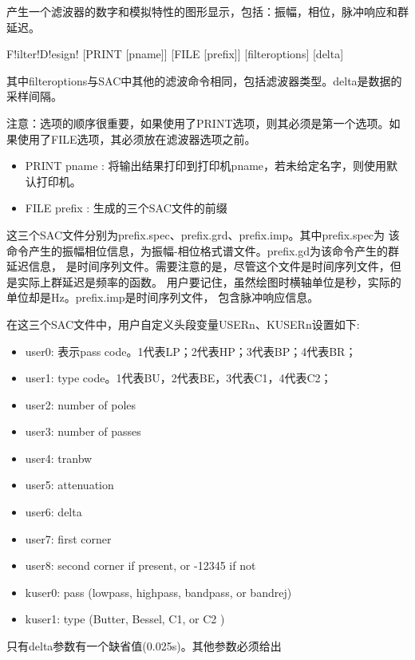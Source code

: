 \label{cmd:filterdesign}

产生一个滤波器的数字和模拟特性的图形显示，包括：振幅，相位，脉冲响应和群延迟。

\begin{SACSTX}
F!ilter!D!esign! [PRINT [pname]] [FILE [prefix]] [filteroptions] [delta]
\end{SACSTX}
其中filteroptions与SAC中其他的滤波命令相同，包括滤波器类型。delta是数据的采样间隔。

注意：选项的顺序很重要，如果使用了PRINT选项，则其必须是第一个选项。如果使用了FILE选项，其必须放在滤波器选项之前。

\begin{itemize}
\item PRINT pname : 将输出结果打印到打印机pname，若未给定名字，则使用默认打印机。
\item FILE prefix : 生成的三个SAC文件的前缀
\end{itemize}

这三个SAC文件分别为prefix.spec、prefix.grd、prefix.imp。其中prefix.spec为
该命令产生的振幅相位信息，为振幅-相位格式谱文件。prefix.gd为该命令产生的群延迟信息，
是时间序列文件。需要注意的是，尽管这个文件是时间序列文件，但是实际上群延迟是频率的函数。
用户要记住，虽然绘图时横轴单位是秒，实际的单位却是Hz。prefix.imp是时间序列文件，
包含脉冲响应信息。

在这三个SAC文件中，用户自定义头段变量USERn、KUSERn设置如下:
\begin{itemize}
\item user0: 表示pass code。1代表LP；2代表HP；3代表BP；4代表BR；
\item user1: type code。1代表BU，2代表BE，3代表C1，4代表C2；
\item user2:  number of poles
\item user3:  number of passes
\item user4:  tranbw
\item user5:  attenuation
\item user6:  delta
\item user7:  first corner
\item user8:  second corner if present, or -12345 if not
\item kuser0: pass (lowpass, highpass, bandpass, or bandrej)
\item kuser1: type (Butter, Bessel, C1, or C2 )
\end{itemize}

只有delta参数有一个缺省值(0.025s)。其他参数必须给出

